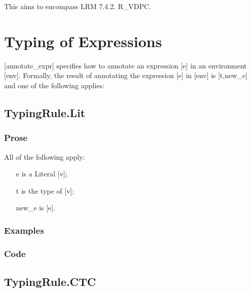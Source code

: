 \documentclass{book}
\begin{document}
This aims to encompass LRM 7.4.2. R\_VDPC.

\section{
Typing of Expressions
}

[annotate\_expr] specifies how to annotate an expression [e] in an environment
[env].  Formally, the result of annotating the expression [e] in [env] is
[t,new\_e] and one of the following applies:

\subsection{TypingRule.Lit}

  \subsubsection{Prose}
  All of the following apply:
  \begin{itemize}
  \item  [e] is a Literal [v];
  \item  [t] is the type of [v];
  \item  [new\_e] is [e].
  \end{itemize}

  \subsubsection{Examples}

  \subsubsection{Code}
 
\subsection{TypingRule.CTC}
\end{document}
